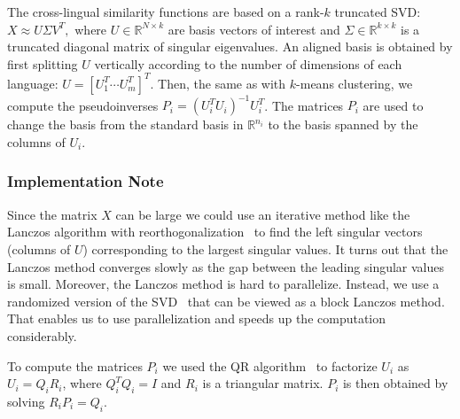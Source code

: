 \documentclass[twoside,11pt]{article}
\newcommand{\RR}{\mathbb{R}}
\begin{document}
The cross-lingual similarity functions are based on a rank-$k$ truncated SVD: $X \approx U \Sigma V^T,$ where $U \in \RR^{N \times k}$ are basis vectors of interest and $\Sigma \in \RR^{k \times k}$ is a truncated diagonal matrix of singular eigenvalues. An aligned basis is obtained by first splitting $U$ vertically according to the number of dimensions of each language: $U = [U_1^T \cdots U_m^T]^T$. Then, the same as with $k$-means clustering, we compute the pseudoinverses $P_i = (U_i^T U_i)^{-1} U_i^T$. The matrices $P_i$ are used to change the basis from the standard basis in $\RR^{n_i}$ to the basis spanned by the columns of $U_i$.

\subsubsection{Implementation Note}

Since the matrix $X$ can be large we could use an iterative method like the Lanczos algorithm with reorthogonalization~\cite{golub} to find the left singular vectors (columns of $U$) corresponding to the largest singular values. It turns out that the Lanczos method converges slowly as the gap between the leading singular values is small. Moreover, the Lanczos method is hard to parallelize. Instead, we use a randomized version of the SVD~ that can be viewed as a block Lanczos method. That enables us to use parallelization and speeds up the computation considerably.

To compute the matrices $P_i$ we used the QR algorithm~\cite{golub} to factorize $U_i$ as $U_i = Q_i R_i$, where $Q_i^TQ_i = I$ and $R_i$ is a triangular matrix. $P_i$ is then obtained by solving $R_i P_i = Q_i$.
\end{document}
